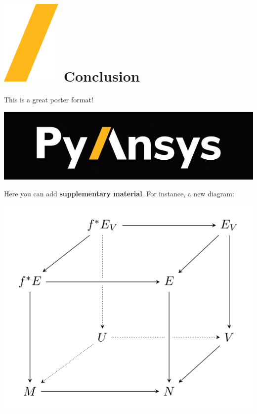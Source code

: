 \documentclass[a0paper,fleqn]{src/betterposter}
\begin{document}
{\section{\includegraphics[height=\fontcharht\font`\S]{img/example/slash.png} Conclusion}
This is a great poster format!

\vfill

\includegraphics[width=\textwidth]{img/example/pyansys_dark}\\

}{

Here you can add \textbf{supplementary material}. For instance, a new diagram:
\begin{center}
\includegraphics[width=\textwidth]{img/example/tikzexample2}
\end{center}

}
\end{document}
